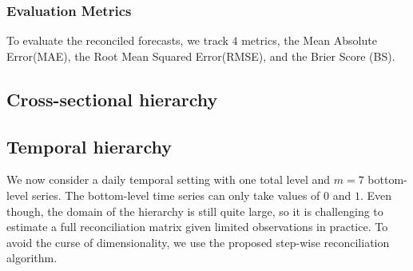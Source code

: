 \documentclass[a4paper,review,12pt,authoryear]{elsarticle}
\let\code=\texttt
\let\proglang=\textsf
\begin{document}
\subsubsection*{Evaluation Metrics}

To evaluate the reconciled forecasts, we track $4$ metrics, the Mean Absolute Error(MAE), the Root Mean Squared Error(RMSE), and the Brier Score (BS). 


\subsection{Cross-sectional hierarchy}

\subsection{Temporal hierarchy}

We now consider a daily temporal setting with one total level and $m=7$ bottom-level series. The bottom-level time series can only take values of $0$ and $1$. 
Even though, the domain of the hierarchy is still quite large, so it is challenging to estimate a full reconciliation matrix given limited observations in practice. 
To avoid the curse of dimensionality, we use the proposed step-wise reconciliation algorithm. 



\end{document}
